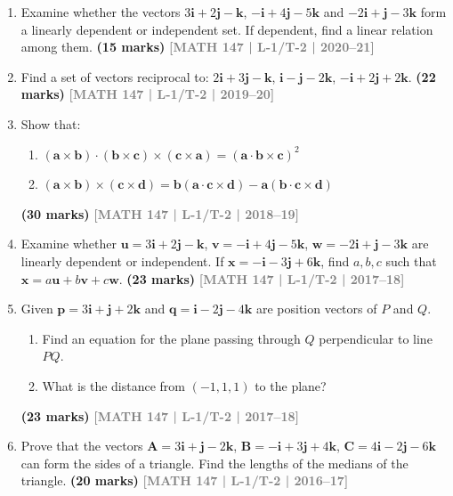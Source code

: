 \documentclass[12pt,a3paper]{article}
\newcommand{\yr}[1]{\hfill\textcolor{gray}{\small\textbf{[#1]}}}
\newcommand{\mk}[1]{\textcolor{orange!70!black}{\small\textbf{(#1 marks)}}}
\begin{document}
\begin{enumerate}
    
    \item Examine whether the vectors $3\mathbf{i}+2\mathbf{j}-\mathbf{k}$, $-\mathbf{i}+4\mathbf{j}-5\mathbf{k}$ and $-2\mathbf{i}+\mathbf{j}-3\mathbf{k}$ form a linearly dependent or independent set. If dependent, find a linear relation among them.
\mk{15} \yr{MATH 147 | L-1/T-2 | 2020--21}


\item Find a set of vectors reciprocal to: $2\mathbf{i}+3\mathbf{j}-\mathbf{k}$, $\mathbf{i}-\mathbf{j}-2\mathbf{k}$, $-\mathbf{i}+2\mathbf{j}+2\mathbf{k}$.
\mk{22} \yr{MATH 147 | L-1/T-2 | 2019--20}


\item Show that:
\begin{enumerate}
  \item $(\mathbf{a}\times\mathbf{b})\cdot(\mathbf{b}\times\mathbf{c})\times(\mathbf{c}\times\mathbf{a})=(\mathbf{a}\cdot\mathbf{b}\times\mathbf{c})^{2}$
  \item $(\mathbf{a}\times\mathbf{b})\times(\mathbf{c}\times\mathbf{d})=\mathbf{b}(\mathbf{a}\cdot\mathbf{c}\times\mathbf{d})-\mathbf{a}(\mathbf{b}\cdot\mathbf{c}\times\mathbf{d})$
\end{enumerate}
\mk{30} \yr{MATH 147 | L-1/T-2 | 2018--19}


\item Examine whether $\mathbf{u}=3\mathbf{i}+2\mathbf{j}-\mathbf{k}$, $\mathbf{v}=-\mathbf{i}+4\mathbf{j}-5\mathbf{k}$, $\mathbf{w}=-2\mathbf{i}+\mathbf{j}-3\mathbf{k}$ are linearly dependent or independent. If $\mathbf{x}=-\mathbf{i}-3\mathbf{j}+6\mathbf{k}$, find $a,b,c$ such that $\mathbf{x}=a\mathbf{u}+b\mathbf{v}+c\mathbf{w}$.
\mk{23} \yr{MATH 147 | L-1/T-2 | 2017--18}


\item Given $\mathbf{p}=3\mathbf{i}+\mathbf{j}+2\mathbf{k}$ and $\mathbf{q}=\mathbf{i}-2\mathbf{j}-4\mathbf{k}$ are position vectors of $P$ and $Q$.
\begin{enumerate}
  \item Find an equation for the plane passing through $Q$ perpendicular to line $PQ$.
  \item What is the distance from $(-1,1,1)$ to the plane?
\end{enumerate}
\mk{23} \yr{MATH 147 | L-1/T-2 | 2017--18}


\item Prove that the vectors $\mathbf{A}=3\mathbf{i}+\mathbf{j}-2\mathbf{k}$, $\mathbf{B}=-\mathbf{i}+3\mathbf{j}+4\mathbf{k}$, $\mathbf{C}=4\mathbf{i}-2\mathbf{j}-6\mathbf{k}$ can form the sides of a triangle. Find the lengths of the medians of the triangle.
\mk{20} \yr{MATH 147 | L-1/T-2 | 2016--17}



\end{enumerate}
\end{document}
